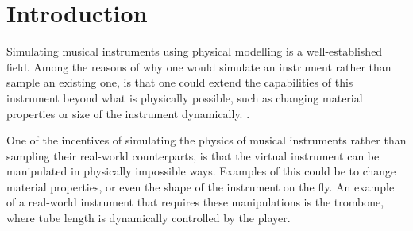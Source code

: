 \section{Introduction}

Simulating musical instruments using physical modelling is a well-established field. Among the reasons of why one would simulate an instrument rather than sample an existing one, is that one could extend the capabilities of this instrument beyond what is physically possible, such as changing material properties or size of the instrument dynamically. .



One of the incentives of simulating the physics of musical instruments rather than sampling their real-world counterparts, is that the virtual instrument can be manipulated in physically impossible ways.  \SWcomment[Will do!] Examples of this could be to change material properties, or even the shape of the instrument on the fly. An example of a real-world instrument that requires these manipulations is the trombone, where tube length is dynamically controlled by the player.


